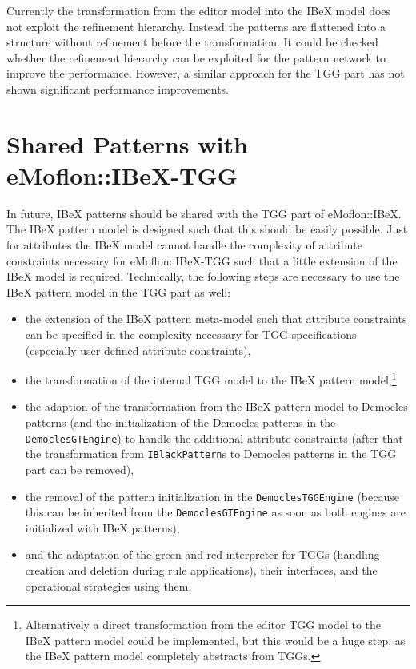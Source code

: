 Currently the transformation from the editor model into the IBeX model does not exploit the refinement hierarchy.
Instead the patterns are flattened into a structure without refinement before the transformation.
It could be checked whether the refinement hierarchy can be exploited for the pattern network to improve the performance.
However, a similar approach for the TGG part \cite{ExploitingTheModularityOfTGGs} has not shown significant performance improvements.

\section{Shared Patterns with eMoflon::IBeX-TGG}
\label{shared-patterns}
In future, IBeX patterns should be shared with the TGG part of eMoflon::IBeX.
The IBeX pattern model is designed such that this should be easily possible.
Just for attributes the IBeX model cannot handle the complexity of attribute constraints necessary for eMoflon::IBeX-TGG such that a little extension of the IBeX model is required.
Technically, the following steps are necessary to use the IBeX pattern model in the TGG part as well:
\begin{itemize}
	\item the extension of the IBeX pattern meta-model such that attribute constraints can be specified in the complexity necessary for TGG specifications (especially user-defined attribute constraints),
	\item the transformation of the internal TGG model to the IBeX pattern model,\footnote{Alternatively a direct transformation from the editor TGG model to the IBeX pattern model could be implemented, but this would be a huge step, as the IBeX pattern model completely abstracts from TGGs.}
	\item the adaption of the transformation from the IBeX pattern model to Democles patterns (and the initialization of the Democles patterns in the \texttt{DemoclesGTEngine}) to handle the additional attribute constraints (after that the transformation from \texttt{IBlackPattern}s to Democles patterns in the TGG part can be removed),
	\item the removal of the pattern initialization in the \texttt{DemoclesTGGEngine} (because this can be inherited from the \texttt{DemoclesGTEngine} as soon as both engines are initialized with IBeX patterns),
	\item and the adaptation of the green and red interpreter for TGGs (handling creation and deletion during rule applications), their interfaces, and the operational strategies using them.
\end{itemize}


